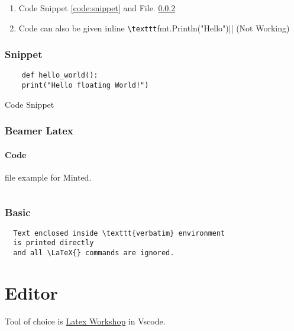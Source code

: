 \documentclass{report}[a4paper,12pt] %
\begin{document}
\begin{enumerate}
  \item Code Snippet \ref{code:snippet} and File. \ref{code:file}
  \item Code can also be given inline \verb|\texttt|fmt.Println("Hello")|| (Not Working)
\end{enumerate}

\subsubsection{Snippet}
\begin{listing}[h]
  \begin{verbatim}
    def hello_world():
    print("Hello floating World!")
  \end{verbatim}
  \caption{Code Snippet}
  \label{code:snippet}
\end{listing}

\subsubsection{Beamer Latex}
\label{code:file}
\paragraph{Code} file example for Minted.
\inputminted{tex}{../../presentation/beamer/tutorial.tex} 

\subsubsection{Basic}
\begin{verbatim}
  Text enclosed inside \texttt{verbatim} environment 
  is printed directly 
  and all \LaTeX{} commands are ignored.
\end{verbatim}

\section{Editor}
Tool of choice is \href{https://github.com/James-Yu/LaTeX-Workshop}{Latex Workshop} in Vscode.
\end{document}
